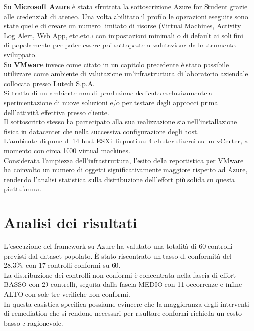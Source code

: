 \documentclass[a4paper,11pt]{report}
\begin{document}
Su \textbf{Microsoft Azure} è stata sfruttata la sottoscrizione Azure for Student grazie alle credenziali di ateneo. Una volta abilitato il profilo le operazioni eseguite sono state quelle di creare un numero limitato di risorse (Virtual Machines, Activity Log Alert, Web App, etc.etc.) con impostazioni minimali o di default ai soli fini di popolamento per poter essere poi sottoposte a valutazione dallo strumento sviluppato. \\

Su \textbf{VMware} invece come citato in un capitolo precedente è stato possibile utilizzare come ambiente di valutazione un'infrastruttura di laboratorio aziendale collocata presso Lutech S.p.A.\\
Si tratta di un ambiente non di produzione dedicato esclusivamente a sperimentazione di nuove soluzioni e/o per testare degli approcci prima dell'attività effettiva presso cliente. \\
Il sottoscritto stesso ha partecipato alla sua realizzazione sia nell'installazione fisica in datacenter che nella successiva configurazione degli host.\\
L'ambiente dispone di 14 host ESXi disposti su 4 cluster diversi su un vCenter, al momento con circa 1000 virtual machines.\\
Considerata l'ampiezza dell'infrastruttura, l'esito della reportistica per VMware ha coinvolto un numero di oggetti significativamente maggiore rispetto ad Azure, rendendo l'analisi statistica sulla distribuzione dell'effort più solida su questa piattaforma.


\section{Analisi dei risultati}

L'esecuzione del framework su Azure ha valutato una totalità di 60 controlli previsti dal dataset popolato. È stato riscontrato un tasso di conformità del 28.3\%, con 17 controlli conformi su 60. \\
La distribuzione dei controlli non conformi è concentrata nella fascia di effort BASSO con 29 controlli, seguita dalla fascia MEDIO con 11 occorrenze e infine ALTO con sole tre verifiche non conformi. \\
In questa casistica specifica possiamo evincere che la maggioranza degli interventi di remediation che si rendono necessari per risultare conformi richieda un costo basso e ragionevole.\\ 
\end{document}
